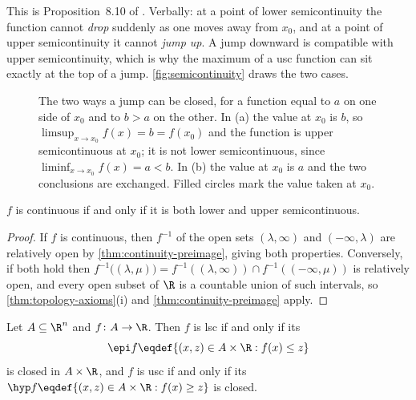 This is Proposition~8.10 of \textcite[p.~271]{fukuda2026notes}. Verbally: at a
point of lower semicontinuity the function
cannot \emph{drop} suddenly as one moves away from $x_0$, and at a point of upper
semicontinuity it cannot \emph{jump up}. A jump downward is compatible with
upper semicontinuity, which is why the maximum of a usc function can sit exactly
at the top of a jump. \autoref{fig:semicontinuity} draws the two cases.

\begin{figure}[htbp]
	\centering
	
	\caption[Upper and lower semicontinuity at a jump]{%
		The two ways a jump can be closed, for a function equal to $a$ on one side
		of $x_0$ and to $b>a$ on the other. In (a) the value at $x_0$ is $b$, so
		$\limsup_{x\to x_0}f(x)=b=f(x_0)$ and the function is upper semicontinuous
		at $x_0$; it is not lower semicontinuous, since
		$\liminf_{x\to x_0}f(x)=a<b$. In (b) the value at $x_0$ is $a$ and the two
		conclusions are exchanged. Filled circles mark the value taken at $x_0$.}
	\label{fig:semicontinuity}
\end{figure}

\begin{corollary}\label{cor:semicontinuity-continuity}
	$f$ is continuous if and only if it is both lower and upper semicontinuous.
\end{corollary}

\begin{proof}
	If $f$ is continuous, then $f^{-1}$ of the open sets $(\lambda,\infty)$ and
	$(-\infty,\lambda)$ are relatively open by \autoref{thm:continuity-preimage},
	giving both properties. Conversely, if both hold then
	$f^{-1}\bigl((\lambda,\mu)\bigr)=f^{-1}((\lambda,\infty))\cap
		f^{-1}((-\infty,\mu))$ is relatively open, and every open subset of $\R$ is a
	countable union of such intervals, so \autoref{thm:topology-axioms}(i) and
	\autoref{thm:continuity-preimage} apply.
\end{proof}

\begin{proposition}\label{prop:epigraph}
	Let $A\subseteq\R^n$ and $f\colon A\to\R$. Then $f$ is lsc if and only if its
	\[
		\epi f\eqdef\{(x,z)\in A\times\R : f(x)\leq z\}
	\]
	is closed in $A\times\R$, and $f$ is usc if and only if its
	 $\hyp f\eqdef\{(x,z)\in A\times\R : f(x)\geq z\}$ is closed.
\end{proposition}

